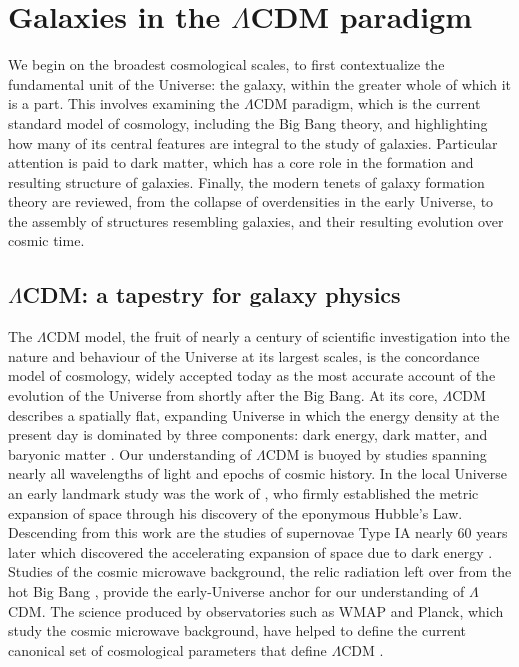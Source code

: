 \section{Galaxies in the \texorpdfstring{$\Lambda$CDM}{LambdaCDM} paradigm}

We begin on the broadest cosmological scales, to first contextualize the fundamental unit of the Universe: the galaxy, within the greater whole of which it is a part. This involves examining the $\Lambda$CDM paradigm, which is the current standard model of cosmology, including the Big Bang theory, and highlighting how many of its central features are integral to the study of galaxies. Particular attention is paid to dark matter, which has a core role in the formation and resulting structure of galaxies. Finally, the modern tenets of galaxy formation theory are reviewed, from the collapse of overdensities in the early Universe, to the assembly of structures resembling galaxies, and their resulting evolution over cosmic time.

\subsection{\texorpdfstring{$\Lambda$CDM}{LambdaCDM}: a tapestry for galaxy physics}

The $\Lambda$CDM model, the fruit of nearly a century of scientific investigation into the nature and behaviour of the Universe at its largest scales, is the concordance model of cosmology, widely accepted today as the most accurate account of the evolution of the Universe from shortly after the Big Bang. At its core, $\Lambda$CDM describes a spatially flat, expanding Universe in which the energy density at the present day is dominated by three components: dark energy, dark matter, and baryonic matter \parencite[e.g.][]{perlmutter99,wmap03,sdssbao05,planck15}. Our understanding of $\Lambda$CDM is buoyed by studies spanning nearly all wavelengths of light and epochs of cosmic history. In the local Universe an early landmark study was the work of \textcite{hubble29}, who firmly established the metric expansion of space through his discovery of the eponymous Hubble's Law. Descending from this work are the studies of supernovae Type IA nearly 60 years later which discovered the accelerating expansion of space due to dark energy \parencite{riess98,perlmutter99}. Studies of the cosmic microwave background, the relic radiation left over from the hot Big Bang \parencite{penzias65}, provide the early-Universe anchor for our understanding of $\Lambda$CDM. The science produced by observatories such as WMAP and Planck, which study the cosmic microwave background, have helped to define the current canonical set of cosmological parameters that define $\Lambda$CDM \parencite{wmap03,planck15}.

